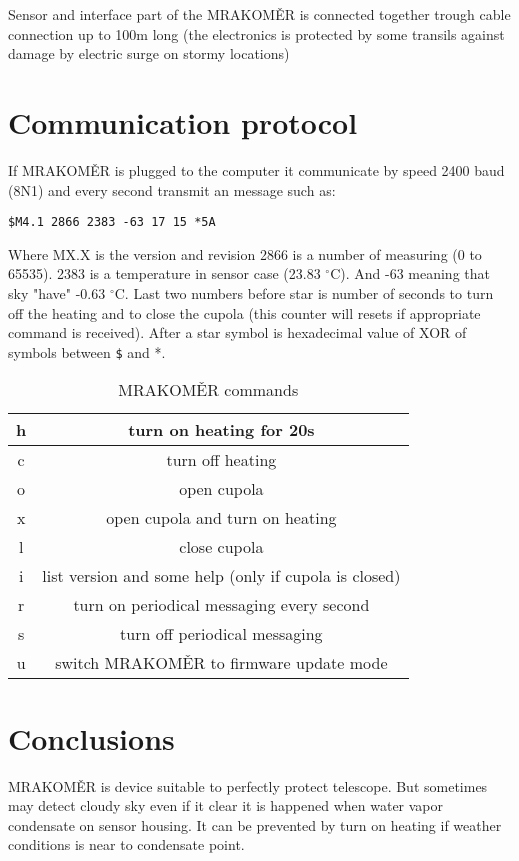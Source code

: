 \documentclass[10pt,a4paper]{article}
\begin{document}
Sensor and interface part of the MRAKOMĚR is connected together trough  cable connection up to 100m long (the electronics is protected by some transils against damage by electric surge on stormy locations)

\section{Communication protocol}
If MRAKOMĚR is plugged to the computer it communicate by speed 2400 baud (8N1) and every second transmit an message such as: 

\begin{verbatim}
$M4.1 2866 2383 -63 17 15 *5A
\end{verbatim}

Where MX.X is the version and revision 2866 is a number of measuring (0 to 65535). 2383 is a temperature in sensor case (23.83 $^\circ$C). And -63 meaning that sky "have" -0.63 $^\circ$C. Last two numbers before star is number of seconds to turn off the heating and to close the cupola (this counter will resets if appropriate command is received). After a star symbol is hexadecimal value of XOR of symbols between \verb+$+ and *.

\begin{table}[htbp]
\begin{center}
\begin{tabular}{|c|c|}
\hline  h & turn on heating for 20s \\ 
\hline  c & turn off heating  \\ 
\hline  o & open cupola \\ 
\hline  x & open cupola and turn on heating \\ 
\hline  l & close cupola \\ 
\hline  i & list version and some help (only if cupola is closed)  \\ 
\hline  r & turn on periodical messaging every second \\ 
\hline  s & turn off periodical messaging \\ 
\hline  u & switch MRAKOMĚR to firmware update mode \\ 
\hline 
\end{tabular}
\caption{MRAKOMĚR commands}
\end{center}

\end{table}

\section{Conclusions}
MRAKOMĚR is device suitable to perfectly protect telescope. But sometimes may detect cloudy sky even if it clear it is happened when water vapor condensate on sensor housing. It can be prevented by turn on heating if weather conditions is near to condensate point. 
\end{document}
